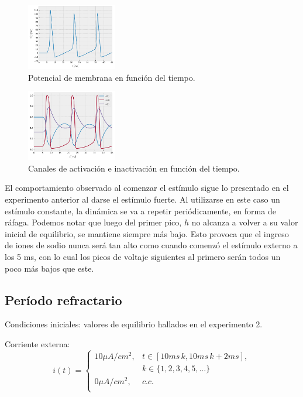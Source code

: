 \documentclass[aps,twocolumn,groupedaddress]{revtex4-2}
\begin{document}
\begin{figure}[ht]
    \centering
    \includegraphics[width=0.35\textwidth]{figs/ej5_potencial.png}
    \caption{Potencial de membrana en función del tiempo.} 
    \label{fig:ej5_potencial}
\end{figure}
\begin{figure}[ht]
    \centering
    \includegraphics[width=0.35\textwidth]{figs/ej5_canales.png}
    \caption{Canales de activación e inactivación en función del tiempo.} 
    \label{fig:ej5_canales}
\end{figure}

El comportamiento observado al comenzar el estímulo sigue lo presentado en el experimento anterior al darse el estímulo fuerte. Al utilizarse en este caso un estímulo constante, la dinámica se va a repetir periódicamente, en forma de ráfaga. Podemos notar que luego del primer pico, $h$ no alcanza a volver a su valor inicial de equilibrio, se mantiene siempre más bajo. Esto provoca que el ingreso de iones de sodio nunca será tan alto como cuando comenzó el estímulo externo a los 5 ms, con lo cual los picos de voltaje siguientes al primero serán todos un poco más bajos que este. 


\subsection{Período refractario}
Condiciones iniciales: valores de equilibrio hallados en el experimento 2.

Corriente externa:
$$
i(t) = \left\{
\begin{array}{ll}
10 \mu A/cm^2, & t\in [10ms\, k,10 ms\, k + 2ms], \\
& k \in \{1,2,3,4,5,...\}\\
0 \mu A/cm^2, & c.c. \\
\end{array}
\right.
$$
\end{document}
